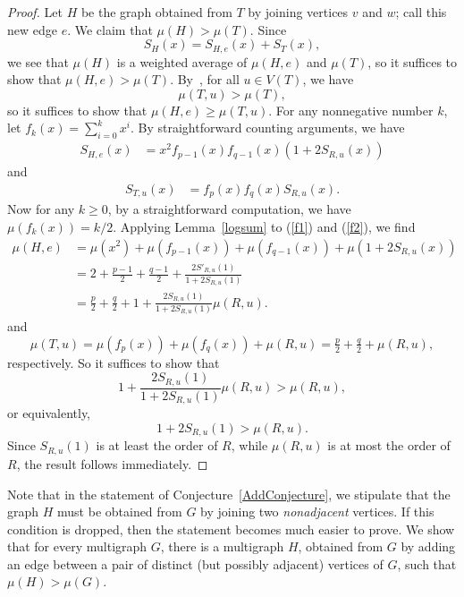 \documentclass[12pt]{article}
\theoremstyle{definition}
\begin{document}
\begin{proof}
Let $H$ be the graph obtained from $T$ by joining vertices $v$ and $w$; call this new edge $e$.  We claim that $\mu(H)>\mu(T)$.  Since 
\[
S_{H}(x)=S_{H,e}(x)+S_T(x),
\]
we see that $\mu(H)$ is a weighted average of $\mu(H,e)$ and $\mu(T)$, so it suffices to show that $\mu(H,e)>\mu(T).$
By~\cite[Theorem 3.9]{Jamison1983}, for all $u\in V(T)$, we have
\[
\mu(T,u)>\mu(T),
\]
so it suffices to show that $\mu(H,e)\geq \mu(T,u).$  For any nonnegative number $k$, let $f_k(x)=\sum_{i=0}^k x^i$.  By straightforward counting arguments, we have
\begin{align}
    S_{H,e}(x)
    &=x^2f_{p-1}(x)f_{q-1}(x)(1+2S_{R,u}(x))\label{f1}
\end{align}
and
\begin{align}
    S_{T,u}(x)
    &=f_p(x)f_q(x)S_{R,u}(x).\label{f2}
\end{align}
Now for any $k\geq 0$, by a straightforward computation, we have $\mu(f_k(x))=k/2$.  Applying Lemma~\ref{logsum} to (\ref{f1}) and (\ref{f2}), we find
\begin{align*}
\mu(H,e)&=\mu(x^2)+\mu(f_{p-1}(x))+\mu(f_{q-1}(x))+\mu(1+2S_{R,u}(x))\\
&=2+\tfrac{p-1}{2}+\tfrac{q-1}{2}+\frac{2S'_{R,u}(1)}{1+2S_{R,u}(1)}\\
&=\tfrac{p}{2}+\tfrac{q}{2}+1+\frac{2S_{R,u}(1)}{1+2S_{R,u}(1)}\mu(R,u).
\end{align*}
and
\[
\mu(T,u)=\mu(f_p(x))+\mu(f_q(x))+\mu(R,u)=\tfrac{p}{2}+\tfrac{q}{2}+\mu(R,u),
\]
respectively.  So it suffices to show that
\[
1+\frac{2S_{R,u}(1)}{1+2S_{R,u}(1)}\mu(R,u)>\mu(R,u),
\]
or equivalently,
\[
1+2S_{R,u}(1)>\mu(R,u).
\]
Since $S_{R,u}(1)$ is at least the order of $R$, while $\mu(R,u)$ is at most the order of $R$, the result follows immediately. 
\end{proof}

Note that in the statement of Conjecture~\ref{AddConjecture}, we stipulate that the graph $H$ must be obtained from $G$ by joining two \emph{nonadjacent} vertices.  If this condition is dropped, then the statement becomes much easier to prove.  We show that for every multigraph $G$, there is a multigraph $H$, obtained from $G$ by adding an edge between a pair of distinct (but possibly adjacent) vertices of $G$, such that $\mu(H)>\mu(G)$.
\end{document}
